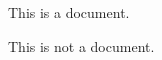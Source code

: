 \documentclass{article}
\title{}
\begin{document}
    This is a document.

    This is not a document.
\end{document}
